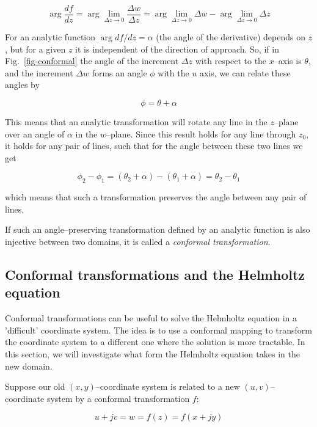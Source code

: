 \begin{sidebar}
\begin{equation}
\arg \frac{df}{dz} = \arg \lim_{\Delta z \to 0} \frac{\Delta w}{\Delta z} = \arg
\lim_{\Delta z   \to 0} \Delta w - \arg \lim_{\Delta z \to 0} \Delta z
\end{equation} 

For an analytic function $\arg df / dz = \alpha$ (the angle of the derivative)
depends on $z$, but for a given $z$ it is independent of the direction of
approach. So, if in Fig.~\ref{fig-conformal} the angle of the increment $\Delta
z$ with respect to the $x$--axis is $\theta$, and the increment $\Delta w$ forms
an angle $\phi$ with the $u$ axis, we can relate these angles by

\begin{equation}
\phi = \theta + \alpha
\end{equation}

This means that an analytic transformation will rotate any line in the
$z$--plane over an angle of $\alpha$ in the $w$--plane.
Since this result holds for any line through $z_0$, it holds for any pair of
lines, such that for the angle between these two lines we get

\begin{equation}
\phi_2 - \phi_1 = (\theta_2 + \alpha) - (\theta_1 + \alpha) = \theta_2 -
\theta_1
\end{equation} 

which means that such a transformation preserves the angle between any pair of
lines.

If such an angle--preserving transformation defined by an analytic function is also injective between two domains, it is
called a \emph{conformal transformation}.

\subsection*{Conformal transformations and the Helmholtz equation}

Conformal transformations can be useful to solve the Helmholtz equation in a
'difficult' coordinate system. The idea is to use a conformal mapping to
transform the coordinate system to a different one where the solution is more
tractable. In this section, we will investigate what form the Helmholtz equation
takes in the new domain.

Suppose our old $(x,y)$--coordinate system is related to a new
$(u,v)$--coordinate system by a conformal transformation $f$:

\begin{equation}
u+jv = w = f(z) = f(x+jy)
\end{equation} 


\end{sidebar}
